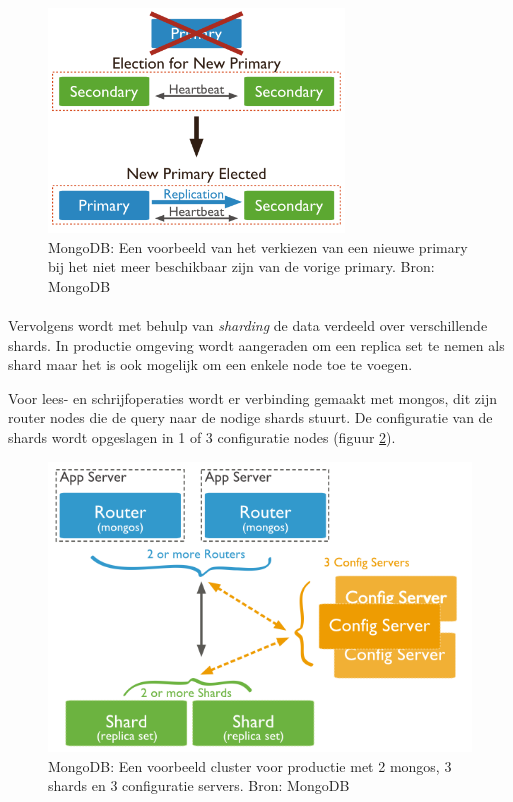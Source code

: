 \begin{figure}[!htb]
	    \centering
    \includegraphics[width=0.7\textwidth]{img/mongodb-replica-set-trigger-election.png}
    \caption{MongoDB: Een voorbeeld van het verkiezen van een nieuwe primary bij het niet meer beschikbaar zijn van de vorige primary.  Bron: MongoDB\cite{mongodb-replicaset}}
    \label{fig:mongodb-replicaset-vote}
\end{figure}

\paragraph{} Vervolgens wordt met behulp van \textit{sharding} de data verdeeld over verschillende shards. In productie omgeving wordt aangeraden om een replica set te nemen als shard maar het is ook mogelijk om een enkele node toe te voegen. 

Voor lees- en schrijfoperaties wordt er verbinding gemaakt met mongos, dit zijn router nodes die de query naar de nodige shards stuurt. De configuratie van de shards wordt opgeslagen in 1 of 3 configuratie nodes (figuur \ref{fig:mongodb-shards}). 

\begin{figure}[!htb]
	    \centering
    \includegraphics[width=\textwidth]{img/mongo-sharded-cluster-production-architecture.png}
    \caption{MongoDB: Een voorbeeld cluster voor productie met 2 mongos, 3 shards en 3 configuratie servers. Bron: MongoDB\cite{mongodb-shard}}
    \label{fig:mongodb-shards}
\end{figure}

